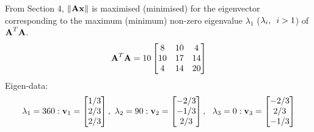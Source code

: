 \documentclass[a4paper]{article}
\numberwithin{equation}{section} %
\newcommand{\norm}[1] {\lVert #1 \rVert} %
\newcommand{\hquad}{\hskip0.5em\relax}%
\newcommand{\B}[1]{\textbf{\textup{#1}}} %
\begin{document}
\begin{TheSolution}
From Section 4, $\norm{\B{Ax}}$ is maximised (minimised) for the eigenvector corresponding to the maximum (minimum) non-zero eigenvalue $\lambda_1$ ($\lambda_i,\hquad i>1$) of $\B{A}^T\B{A}$.
\[
\B{A}^T\B{A}=10\begin{bmatrix}8 & 10 & 4\\10 & 17 & 14\\4 & 14 & 20 \end{bmatrix}
\]
Eigen-data:
\[
{{\lambda }_{1}}=360:{{\B{v}}_{1}}=\begin{bmatrix}
   1/3  \\
   2/3  \\
   2/3  \\
\end{bmatrix} ,\ {{\lambda }_{2}}=90:{{\B{v}}_{2}}=\left[ \begin{matrix}
   -2/3 \\
   -1/3  \\
   2/3 \\
\end{matrix} \right],\ \ {{\lambda }_{3}}=0:{{\B{v}}_{3}}=\left[ \begin{matrix}
   -2/3  \\
   2/3  \\
   -1/3  \\
\end{matrix} \right]
\]


\end{TheSolution}
\end{document}
